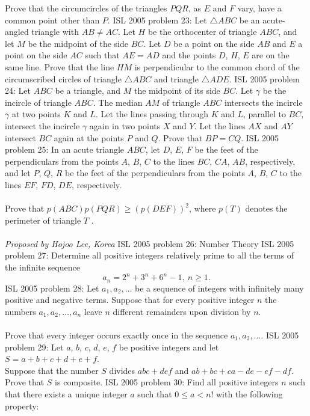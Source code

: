 Prove that the circumcircles of the triangles $PQR$, as $E$ and $F$ vary, have a common point other than $P$. 
ISL 2005 problem 23:  Let $\triangle ABC$ be an acute-angled triangle with $AB \not= AC$. Let $H$ be the orthocenter of triangle $ABC$, and let $M$ be the midpoint of the side $BC$. Let $D$ be a point on the side $AB$ and $E$ a point on the side $AC$ such that $AE=AD$ and the points $D$, $H$, $E$ are on the same line. Prove that the line $HM$ is perpendicular to the common chord of the circumscribed circles of triangle $\triangle ABC$ and triangle $\triangle ADE$. 
ISL 2005 problem 24:  Let $ABC$ be a triangle, and $M$ the midpoint of its side $BC$. Let $\gamma$ be the incircle of triangle $ABC$. The median $AM$ of triangle $ABC$ intersects the incircle $\gamma$ at two points $K$ and $L$. Let the lines passing through $K$ and $L$, parallel to $BC$, intersect the incircle $\gamma$ again in two points $X$ and $Y$. Let the lines $AX$ and $AY$ intersect $BC$ again at the points $P$ and $Q$. Prove that $BP = CQ$. 
ISL 2005 problem 25:  In an acute triangle $ABC$, let $D$, $E$, $F$ be the feet of the perpendiculars from the points $A$, $B$, $C$ to the lines $BC$, $CA$, $AB$, respectively, and let $P$, $Q$, $R$ be the feet of the perpendiculars from the points $A$, $B$, $C$ to the lines $EF$, $FD$, $DE$, respectively. \\\\
Prove that $p\left(ABC\right)p\left(PQR\right) \ge \left(p\left(DEF\right)\right)^2$, where $p\left(T\right)$ denotes the perimeter of triangle $T$ . \\\\
\textit{Proposed by Hojoo Lee, Korea} 
ISL 2005 problem 26:  Number Theory 
ISL 2005 problem 27:  Determine all positive integers relatively prime to all the terms of the infinite sequence
\[ a_n=2^n+3^n+6^n -1,\ n\geq 1. \] 
ISL 2005 problem 28:  Let $a_1,a_2,\ldots$ be a sequence of integers with infinitely many positive and negative terms. Suppose that for every positive integer $n$ the numbers $a_1,a_2,\ldots,a_n$ leave $n$ different remainders upon division by $n$. \\\\
Prove that every integer occurs exactly once in the sequence $a_1,a_2,\ldots$. 
ISL 2005 problem 29:  Let $ a$, $ b$, $ c$, $ d$, $ e$, $ f$ be positive integers and let $ S = a+b+c+d+e+f$. \\
Suppose that the number $ S$ divides $ abc+def$ and  $ ab+bc+ca-de-ef-df$. Prove that $ S$ is composite. 
ISL 2005 problem 30:  Find all positive integers $ n$ such that there exists a unique integer $ a$ such that $ 0\leq a < n!$ with the following property:
